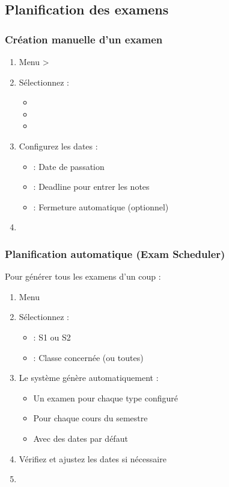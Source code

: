\subsection{Planification des examens}

\subsubsection{Création manuelle d'un examen}

\begin{enumerate}[leftmargin=*]
    \item Menu  > 
    \item Sélectionnez :
    \begin{itemize}
        \item {}
        \item {}
        \item {}
    \end{itemize}
    \item Configurez les dates :
    \begin{itemize}
        \item {} : Date de passation
        \item {} : Deadline pour entrer les notes
        \item {} : Fermeture automatique (optionnel)
    \end{itemize}
    \item {}
\end{enumerate}

\subsubsection{Planification automatique (Exam Scheduler)}

Pour générer tous les examens d'un coup :

\begin{enumerate}[leftmargin=*]
    \item Menu 
    \item Sélectionnez :
    \begin{itemize}
        \item {} : S1 ou S2
        \item {} : Classe concernée (ou toutes)
    \end{itemize}
    \item Le système génère automatiquement :
    \begin{itemize}
        \item Un examen pour chaque type configuré
        \item Pour chaque cours du semestre
        \item Avec des dates par défaut
    \end{itemize}
    \item Vérifiez et ajustez les dates si nécessaire
    \item {}
\end{enumerate}

